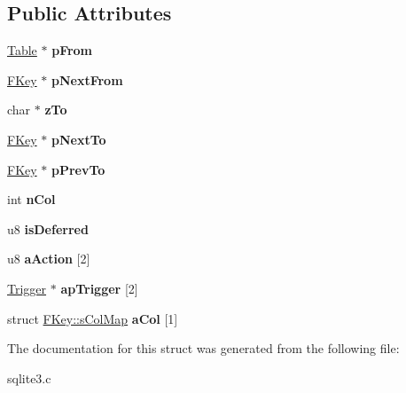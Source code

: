 \subsection*{Public Attributes}
\begin{DoxyCompactItemize}
\item 
\hyperlink{structTable}{Table} $\ast$ {\bfseries p\+From}\hypertarget{structFKey_a6d476f3fbfa75a19c5c5a9edec4e79eb}{}\label{structFKey_a6d476f3fbfa75a19c5c5a9edec4e79eb}

\item 
\hyperlink{structFKey}{F\+Key} $\ast$ {\bfseries p\+Next\+From}\hypertarget{structFKey_ac64ff66b30167715c8822a74c2809075}{}\label{structFKey_ac64ff66b30167715c8822a74c2809075}

\item 
char $\ast$ {\bfseries z\+To}\hypertarget{structFKey_a1eac10bab38a0ac9f88306fbbabbe5d6}{}\label{structFKey_a1eac10bab38a0ac9f88306fbbabbe5d6}

\item 
\hyperlink{structFKey}{F\+Key} $\ast$ {\bfseries p\+Next\+To}\hypertarget{structFKey_ac29b26999113602e7e3921bf07643c04}{}\label{structFKey_ac29b26999113602e7e3921bf07643c04}

\item 
\hyperlink{structFKey}{F\+Key} $\ast$ {\bfseries p\+Prev\+To}\hypertarget{structFKey_a56189e420e91df86513e6895db518eca}{}\label{structFKey_a56189e420e91df86513e6895db518eca}

\item 
int {\bfseries n\+Col}\hypertarget{structFKey_a611e3223f3f434e0a635e036dc100cbb}{}\label{structFKey_a611e3223f3f434e0a635e036dc100cbb}

\item 
u8 {\bfseries is\+Deferred}\hypertarget{structFKey_ab742714b17f2c13353837e1fdde51cc7}{}\label{structFKey_ab742714b17f2c13353837e1fdde51cc7}

\item 
u8 {\bfseries a\+Action} \mbox{[}2\mbox{]}\hypertarget{structFKey_a68a08f58294bf845e9c77d785499d222}{}\label{structFKey_a68a08f58294bf845e9c77d785499d222}

\item 
\hyperlink{structTrigger}{Trigger} $\ast$ {\bfseries ap\+Trigger} \mbox{[}2\mbox{]}\hypertarget{structFKey_a9ce15cb27b675836bc714ab18fd8a008}{}\label{structFKey_a9ce15cb27b675836bc714ab18fd8a008}

\item 
struct \hyperlink{structFKey_1_1sColMap}{F\+Key\+::s\+Col\+Map} {\bfseries a\+Col} \mbox{[}1\mbox{]}\hypertarget{structFKey_a5b230bc6c10a67f432ed7d5ebc92bcd2}{}\label{structFKey_a5b230bc6c10a67f432ed7d5ebc92bcd2}

\end{DoxyCompactItemize}


The documentation for this struct was generated from the following file\+:\begin{DoxyCompactItemize}
\item 
sqlite3.\+c\end{DoxyCompactItemize}

